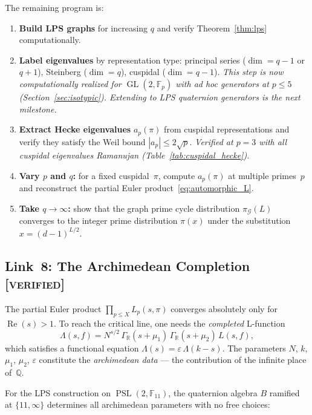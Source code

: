 \documentclass[12pt,reqno]{amsart}
\theoremstyle{plain}
\theoremstyle{definition}
\theoremstyle{remark}
\DeclareMathOperator{\GL}{GL}
\DeclareMathOperator{\PSL}{PSL}
\newcommand{\QQ}{\mathbb{Q}}
\newcommand{\RR}{\mathbb{R}}
\newcommand{\FF}{\mathbb{F}}
\begin{document}
The remaining program is:
\begin{enumerate}[nosep]
  \item \textbf{Build LPS graphs} for increasing $q$ and verify
    Theorem~\ref{thm:lps} computationally.
  \item \textbf{Label eigenvalues} by representation type: principal
    series ($\dim = q-1$ or $q+1$), Steinberg ($\dim = q$), cuspidal
    ($\dim = q-1$).  \emph{This step is now computationally realized
    for $\GL(2, \FF_p)$ with ad hoc generators at $p \leq 5$
    (Section~\ref{sec:isotypic}).  Extending to LPS quaternion
    generators is the next milestone.}
  \item \textbf{Extract Hecke eigenvalues} $a_p(\pi)$ from cuspidal
    representations and verify they satisfy the Weil bound
    $|a_p| \leq 2\sqrt{p}$.  \emph{Verified at $p = 3$ with all
    cuspidal eigenvalues Ramanujan
    (Table~\ref{tab:cuspidal_hecke}).}
  \item \textbf{Vary $p$ and $q$:} for a fixed cuspidal~$\pi$,
    compute $a_p(\pi)$ at multiple primes~$p$ and reconstruct the
    partial Euler product~\eqref{eq:automorphic_L}.
  \item \textbf{Take $q \to \infty$:} show that the graph prime cycle
    distribution $\pi_\mathcal{G}(L)$ converges to the integer prime
    distribution $\pi(x)$ under the substitution
    $x = (d-1)^{L/2}$.
\end{enumerate}

\subsection{Link~8: The Archimedean Completion
  \textnormal{[\textsc{verified}]}}
\label{sec:archimedean}

The partial Euler product $\prod_{p \leq X} L_p(s, \pi)$ converges
absolutely only for $\operatorname{Re}(s) > 1$.  To reach the critical
line, one needs the \emph{completed} L-function
\begin{equation}\label{eq:completed}
  \Lambda(s, f) = N^{s/2} \, \Gamma_\RR(s + \mu_1) \,
  \Gamma_\RR(s + \mu_2) \, L(s, f),
\end{equation}
which satisfies a functional equation
$\Lambda(s) = \varepsilon \, \Lambda(k - s)$.
The parameters $N$, $k$, $\mu_1$, $\mu_2$, $\varepsilon$ constitute
the \emph{archimedean data} --- the contribution of the infinite
place of~$\QQ$.

For the LPS construction on $\PSL(2, \FF_{11})$, the quaternion algebra
$B$ ramified at $\{11, \infty\}$ determines all archimedean parameters
with no free choices:
\end{document}
